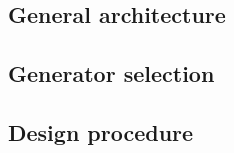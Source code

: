 \documentclass[../TFG_Report.tex]{subfiles}
\begin{document}
\subsection{General architecture}


\subsection{Generator selection}

\subsection{Design procedure}
	
	
\end{document}
